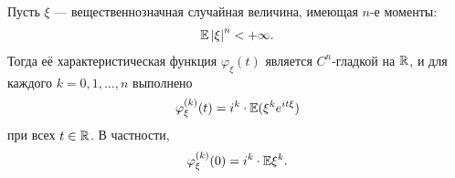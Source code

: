 \documentclass[../main.tex]{subfiles}
\begin{document}
\begin{thm}
 \label{theorem:moments_imply_char_func_smoothness}
 Пусть $ \xi $ --- вещественнозначная случайная величина, имеющая $ n $-е моменты:
 \begin{align*}
  \mathbb E \left| \xi \right|^{n} < +\infty.
 \end{align*} Тогда её характеристическая функция $ \varphi_\xi(t) $ является $ C^{n} $-гладкой на $ \mathbb{R} $, и для каждого $ k = 0, 1, \ldots, n $ выполнено
 \begin{align*}
  \varphi_\xi^{(k)}(t) = i^{k} \cdot \mathbb E (\xi^{k} e^{it\xi})
 \end{align*} при всех $ t \in \mathbb{R} $. В частности,
 \begin{align*}
  \varphi_\xi^{(k)}(0) = i^{k} \cdot \mathbb E\xi^{k}.
 \end{align*}
\end{thm}
\end{document}
